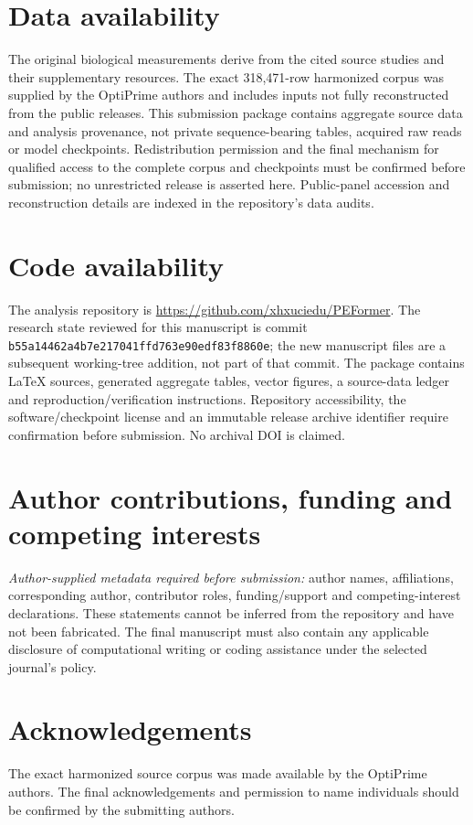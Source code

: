 \section*{Data availability}
The original biological measurements derive from the cited source studies and their supplementary resources. The exact 318,471-row harmonized corpus was supplied by the OptiPrime authors and includes inputs not fully reconstructed from the public releases. This submission package contains aggregate source data and analysis provenance, not private sequence-bearing tables, acquired raw reads or model checkpoints. Redistribution permission and the final mechanism for qualified access to the complete corpus and checkpoints must be confirmed before submission; no unrestricted release is asserted here. Public-panel accession and reconstruction details are indexed in the repository's data audits.

\section*{Code availability}
The analysis repository is \url{https://github.com/xhxuciedu/PEFormer}. The research state reviewed for this manuscript is commit \texttt{b55a14462a4b7e217041ffd763e90edf83f8860e}; the new manuscript files are a subsequent working-tree addition, not part of that commit. The package contains LaTeX sources, generated aggregate tables, vector figures, a source-data ledger and reproduction/verification instructions. Repository accessibility, the software/checkpoint license and an immutable release archive identifier require confirmation before submission. No archival DOI is claimed.

\section*{Author contributions, funding and competing interests}
\textit{Author-supplied metadata required before submission:} author names, affiliations, corresponding author, contributor roles, funding/support and competing-interest declarations. These statements cannot be inferred from the repository and have not been fabricated. The final manuscript must also contain any applicable disclosure of computational writing or coding assistance under the selected journal's policy.

\section*{Acknowledgements}
The exact harmonized source corpus was made available by the OptiPrime authors. The final acknowledgements and permission to name individuals should be confirmed by the submitting authors.
